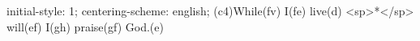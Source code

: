 initial-style: 1;
centering-scheme: english;
(c4)While(fv) I(fe) live(d) <sp>*</sp> will(ef) I(gh) praise(gf) God.(e)
